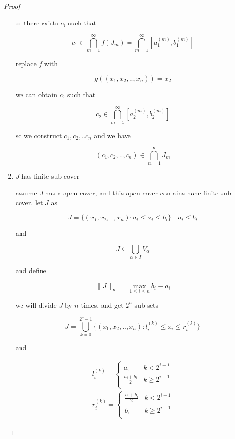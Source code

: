 \begin{proof}
\begin{enumerate}
        so there exists $c_1$ such that

        \[
            c_1 \in \bigcap_{m=1}^{\infty}f(J_m) = \bigcap_{m=1}^{\infty}[a_1^{(m)}, b_1^{(m)}]
        \]

        replace $f$ with

        \[
            g((x_1, x_2, .. ,x_n)) = x_2
        \]

        we can obtain $c_2$ such that

        \[
            c_2 \in \bigcap_{m=1}^{\infty}[a_2^{(m)}, b_2^{(m)}]
        \]

        so we construct $c_1, c_2, .. c_n$ and we have

        \[
            (c_1, c_2, .., c_n) \in \bigcap_{m=1}^{\infty}J_m
        \]

        \item $J$ has finite sub cover

        assume $J$ has a open cover, and this open cover contains none finite sub cover.
        let $J$ as

        \[
            J = \{ (x_1,x_2, .., x_n): a_i \le x_i \le b_i\} \quad a_i \le b_i
        \]

        and

        \[
            J \subseteq \bigcup_{\alpha \in I}V_{\alpha}
        \]

        and define

        \[
            \| J \|_{\infty} = \max_{1 \le i \le n}b_i - a_i
        \]

        we will divide $J$ by $n$ times, and get $2^n$ sub sets

        \[
            J = \bigcup_{k=0}^{2^n-1} \{ (x_1, x_2, .., x_n): l_i^{(k)} \le x_i \le r_i^{(k)} \}
        \]

        and

        \begin{align*}
            l_i^{(k)} = \begin{cases}
                a_i & k < 2^{i-1} \\
                \frac{a_i + b_i}{2} & k \ge 2^{i-1} \\
            \end{cases} \\
            r_i^{(k)} = \begin{cases}
                \frac{a_i + b_i}{2} & k < 2^{i-1} \\
                b_i & k \ge 2^{i-1} \\
            \end{cases}
        \end{align*}


\end{enumerate}
\end{proof}
